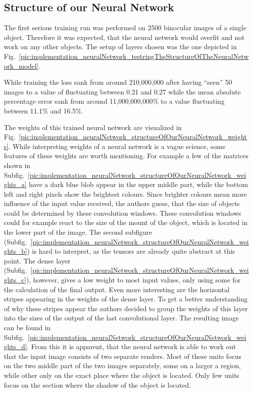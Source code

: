 \subsection{Structure of our Neural Network}
The first serious training run was performed on 2500 binocular images of a single object. Therefore it was expected, that the neural network would overfit and not work on any other objects. The setup of layers chosen was the one depicted in Fig.~\ref{pic:implementation_neuralNetwork_testringTheStructureOfTheNeuralNetwork_model}.

While training the loss sank from around 210,000,000 after having ``seen'' 50 images to a value of fluctuating between 0.21 and 0.27 while the mean absolute percentage error sank from around 11,000,000,000\% to a value fluctuating between 11.1\% and 16.5\%.

The weights of this trained neural network are visualized in Fig.~\ref{pic:implementation_neuralNetwork_structureOfOurNeuralNetwork_weights}. While interpreting weights of a neural network is a vague science, some features of these weights are worth mentioning. For example a few of the matrices shown in Subfig.~\ref{pic:implementation_neuralNetwork_structureOfOurNeuralNetwork_weights_a} have a dark blue blob appear in the upper middle part, while the bottom left and right pixels show the brightest colours. Since brighter colours mean more influence of the input value received, the authors guess, that the size of objects could be determined by these convolution windows. These convolution windows could for example react to the size of the mount of the object, which is located in the lower part of the image. The second subfigure (Subfig.~\ref{pic:implementation_neuralNetwork_structureOfOurNeuralNetwork_weights_b}) is hard to interpret, as the tensors are already quite abstract at this point. The dense layer (Subfig.~\ref{pic:implementation_neuralNetwork_structureOfOurNeuralNetwork_weights_c}), however, gives a low weight to most input values, only using some for the calculation of the final output. Even more interesting are the horizontal stripes appearing in the weights of the dense layer. To get a better understanding of why these stripes appear the authors decided to group the weights of this layer into the sizes of the output of the last convolutional layer. The resulting image can be found in Subfig.~\ref{pic:implementation_neuralNetwork_structureOfOurNeuralNetwork_weights_d}. From this it is apparent, that the neural network is able to work out that the input image consists of two separate renders. Most of these units focus on the two middle part of the two images separately, some on a larger a region, while other only on the exact place where the object is located. Only few units focus on the section where the shadow of the object is located.

